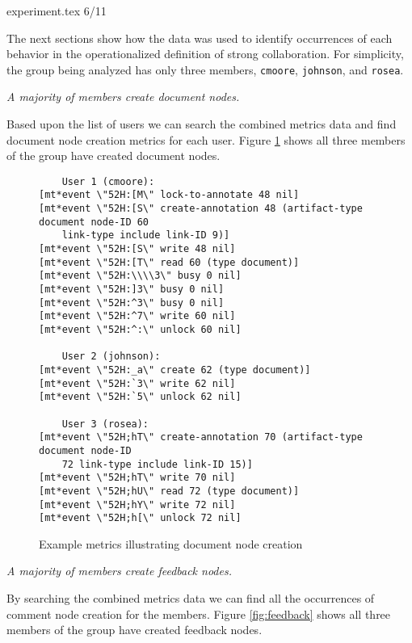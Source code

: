 experiment.tex 6/11

  The next sections show
how the data was used to identify occurrences of each behavior in the
operationalized definition of strong collaboration.  For simplicity, the
group being analyzed has only three members, {\tt cmoore}, {\tt johnson},
and {\tt rosea}.

\begin{itemizenoindent}

\item{\em A majority of members create document nodes.}

  Based upon the list of users we can search the combined metrics data
  and find document node creation metrics for each user.  Figure
  \ref{fig:create} shows all three members of the group have created
  document nodes.

  \begin{figure}[htb]
    \small
    \begin{verbatim}
    User 1 (cmoore): 
[mt*event \"52H:[M\" lock-to-annotate 48 nil] 
[mt*event \"52H:[S\" create-annotation 48 (artifact-type document node-ID 60
    link-type include link-ID 9)] 
[mt*event \"52H:[S\" write 48 nil] 
[mt*event \"52H:[T\" read 60 (type document)] 
[mt*event \"52H:\\\\3\" busy 0 nil]
[mt*event \"52H:]3\" busy 0 nil] 
[mt*event \"52H:^3\" busy 0 nil] 
[mt*event \"52H:^7\" write 60 nil] 
[mt*event \"52H:^:\" unlock 60 nil]

    User 2 (johnson):
[mt*event \"52H:_a\" create 62 (type document)]
[mt*event \"52H:`3\" write 62 nil]
[mt*event \"52H:`5\" unlock 62 nil] 

    User 3 (rosea):
[mt*event \"52H;hT\" create-annotation 70 (artifact-type document node-ID
    72 link-type include link-ID 15)] 
[mt*event \"52H;hT\" write 70 nil]
[mt*event \"52H;hU\" read 72 (type document)]
[mt*event \"52H;hY\" write 72 nil]
[mt*event \"52H;h[\" unlock 72 nil]
    \end{verbatim}
    \normalsize
    \caption{Example metrics illustrating document node creation}
    \label{fig:create}
  \end{figure}


\item{\em A majority of members create feedback nodes.}

  By searching the combined metrics data we can find all the occurrences of
  comment node creation for the members.  Figure \ref{fig:feedback} shows all
  three members of the group have created feedback nodes.


\end{itemizenoindent}
